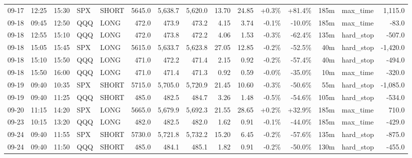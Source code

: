 \documentclass[11pt,a4paper,twoside]{article}
\begin{document}
\begin{landscape}
\begin{center}
\begin{longtable}{>{\color{txtmain}}l l l l l r r r r r r r r >{\color{txtmain}}l r}
09-17 & 12:25 & 15:30 & SPX & SHORT & 5645.0 & 5,638.7 & 5,620.0 & 13.70 & 24.85 & \textcolor{wingreen}{+0.3\%} & \textcolor{wingreen}{+81.4\%} & 185m & max\_time & \textcolor{wingreen}{1,115.0} \\
09-18 & 09:45 & 12:50 & QQQ & LONG & 472.0 & 473.9 & 473.2 & 4.15 & 3.74 & \textcolor{lossred}{-0.1\%} & \textcolor{lossred}{-10.0\%} & 185m & max\_time & \textcolor{lossred}{-83.0} \\
09-18 & 12:55 & 15:10 & QQQ & LONG & 472.0 & 473.8 & 472.2 & 4.06 & 1.53 & \textcolor{lossred}{-0.3\%} & \textcolor{lossred}{-62.4\%} & 135m & hard\_stop & \textcolor{lossred}{-507.0} \\
09-18 & 15:05 & 15:45 & SPX & LONG & 5615.0 & 5,633.7 & 5,623.8 & 27.05 & 12.85 & \textcolor{lossred}{-0.2\%} & \textcolor{lossred}{-52.5\%} & 40m & hard\_stop & \textcolor{lossred}{-1,420.0} \\
09-18 & 15:10 & 15:50 & QQQ & LONG & 471.0 & 472.2 & 471.4 & 2.15 & 0.92 & \textcolor{lossred}{-0.2\%} & \textcolor{lossred}{-57.4\%} & 40m & hard\_stop & \textcolor{lossred}{-494.0} \\
09-18 & 15:50 & 16:00 & QQQ & LONG & 471.0 & 471.4 & 471.3 & 0.92 & 0.59 & \textcolor{lossred}{-0.0\%} & \textcolor{lossred}{-35.0\%} & 10m & max\_time & \textcolor{lossred}{-320.0} \\
09-19 & 09:40 & 10:35 & SPX & SHORT & 5715.0 & 5,705.0 & 5,720.9 & 21.45 & 10.60 & \textcolor{lossred}{-0.3\%} & \textcolor{lossred}{-50.6\%} & 55m & hard\_stop & \textcolor{lossred}{-1,085.0} \\
09-19 & 09:40 & 11:25 & QQQ & SHORT & 485.0 & 482.5 & 484.7 & 3.26 & 1.48 & \textcolor{lossred}{-0.5\%} & \textcolor{lossred}{-54.6\%} & 105m & hard\_stop & \textcolor{lossred}{-534.0} \\
09-20 & 11:15 & 14:20 & SPX & LONG & 5665.0 & 5,679.9 & 5,692.3 & 21.55 & 28.65 & \textcolor{wingreen}{+0.2\%} & \textcolor{wingreen}{+32.9\%} & 185m & max\_time & \textcolor{wingreen}{710.0} \\
09-23 & 10:15 & 13:20 & QQQ & LONG & 482.0 & 482.5 & 482.0 & 1.62 & 0.91 & \textcolor{lossred}{-0.1\%} & \textcolor{lossred}{-44.0\%} & 185m & max\_time & \textcolor{lossred}{-429.0} \\
09-24 & 09:40 & 11:55 & SPX & SHORT & 5730.0 & 5,721.8 & 5,732.2 & 15.20 & 6.45 & \textcolor{lossred}{-0.2\%} & \textcolor{lossred}{-57.6\%} & 135m & hard\_stop & \textcolor{lossred}{-875.0} \\
09-24 & 09:40 & 11:50 & QQQ & SHORT & 485.0 & 484.1 & 485.1 & 1.82 & 0.91 & \textcolor{lossred}{-0.2\%} & \textcolor{lossred}{-50.0\%} & 130m & hard\_stop & \textcolor{lossred}{-455.0} \\

\end{longtable}
\end{center}
\end{landscape}
\end{document}
